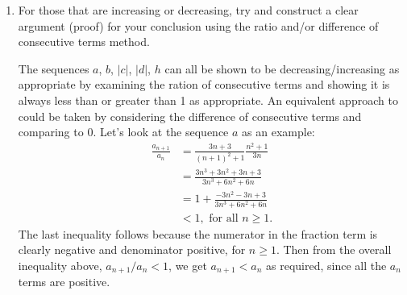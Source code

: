 \documentclass[oneside,10pt]{amsart}
\begin{document}
\begin{enumerate}
\begin{enumerate}
\begin{solution}
{}\end{solution}
\begin{sagesilent}
var('n');
def a(n):
    if n==1:
        return 3
    else:
        return a(n-1)/(n-1);
\end{sagesilent}
\begin{solution}{The factorial form of $f_n$ clearly shows that the sequence will be decreasing after the first couple of terms. The plot looks like

}\end{solution}
\begin{sagesilent}
var('n');
def a(n):
    if n==0:
        return 2
    else:
        return a(n-1)/(1+a(n-1));
\end{sagesilent}
\begin{solution}{The plot of the beginning of $\left \{ g_n \right \}$ looks like

}\end{solution}
\begin{sagesilent}
var('n');
def a(n):
    return 3^n/factorial(2*n)
\end{sagesilent}
\begin{solution}{The plot of the beginning of $\left \{ h_n \right \}$ looks like

}\end{solution}
    \item
    For those that are increasing or decreasing, try and construct a clear argument (proof) for your conclusion using the ratio and/or difference of consecutive terms method.
\begin{solution}
The sequences $a$, $b$, $|c|$, $|d|$, $h$ can all be shown to be decreasing/increasing as appropriate by examining the ration of consecutive terms and showing it is always less than or greater than 1 as appropriate. An equivalent approach to could be taken by considering the difference of consecutive terms and comparing to $0$. Let's look at the sequence $a$ as an example:
\begin{align*}
\frac{a_{n+1}}{a_n} & = \frac{3n+3}{(n+1)^2 + 1} \frac{n^2 +1}{3n} \\
&= \frac{3n^3 + 3n^2 + 3n + 3}{3n^3+6n^2+6n} \\
& = 1 + \frac{-3n^2 -3n + 3}{3n^3+6n^2+6n}\\
&< 1 , \text{ for all $n \geq 1$.}
\end{align*}
The last inequality follows because the numerator in the fraction term is clearly negative and denominator positive, for $n \geq 1$. Then from the overall inequality above, $a_{n+1} / a_n < 1$, we get $a_{n+1} < a_n$ as required, since all the $a_n$ terms are positive.


\end{solution}
\end{enumerate}
\end{enumerate}
\end{document}
